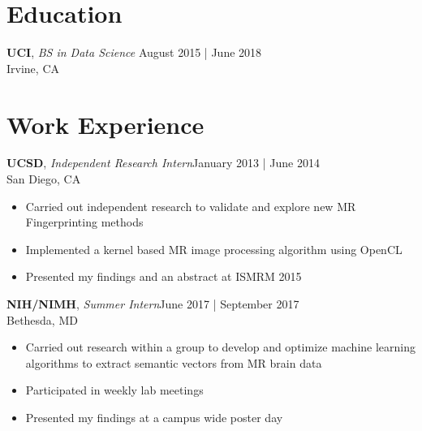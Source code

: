 \documentclass[line,margin]{res}
\begin{document}
\address{maxwell.li.wong@gmail.com | github.com/mwong94 | (858) 431-9185}
\begin{resume}
	\vspace{-5mm}
	        
	
	\section{Education}
	    \textbf{UCI}, {\sl BS in Data Science} \hfill August 2015 | June 2018\\Irvine, CA
	
	\section{Work Experience}
    	\textbf{UCSD}, {\sl Independent Research Intern}\hfill January 2013 | June 2014\\San Diego, CA\\
    	\begin{itemize} \itemsep 3pt
        	\item Carried out independent research to validate and explore new MR Fingerprinting methods
        	\item Implemented a kernel based MR image processing algorithm using OpenCL
        	\item Presented my findings and an abstract at ISMRM 2015
        	\end{itemize}
        	\textbf{NIH/NIMH}, {\sl Summer Intern}\hfill June 2017 | September 2017\\Bethesda, MD\\\begin{itemize} \itemsep 3pt
        	\item Carried out research within a group to develop and optimize machine learning algorithms to extract semantic vectors from MR brain data
        	\item Participated in weekly lab meetings
        	\item Presented my findings at a campus wide poster day
    	\end{itemize}
	

\end{resume}
\end{document}
